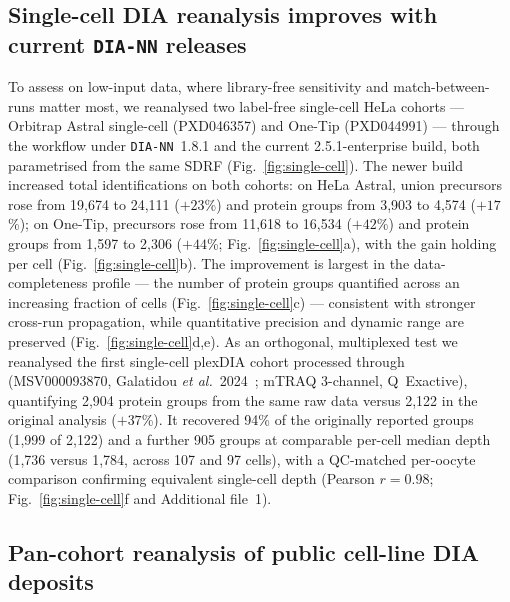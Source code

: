 \subsection{Single-cell DIA reanalysis improves with current \texttt{DIA-NN} releases}
\label{sec:single-cell}

To assess \quantmsdiann{} on low-input data, where library-free sensitivity and match-between-runs matter most, we reanalysed two label-free single-cell HeLa cohorts --- Orbitrap Astral single-cell (PXD046357) and One-Tip (PXD044991) --- through the workflow under \texttt{DIA-NN}~1.8.1 and the current 2.5.1-enterprise build, both parametrised from the same SDRF (Fig.~\ref{fig:single-cell}).
The newer build increased total identifications on both cohorts: on HeLa Astral, union precursors rose from 19{,}674 to 24{,}111 ($+23$\%) and protein groups from 3{,}903 to 4{,}574 ($+17$\%); on One-Tip, precursors rose from 11{,}618 to 16{,}534 ($+42$\%) and protein groups from 1{,}597 to 2{,}306 ($+44$\%; Fig.~\ref{fig:single-cell}a), with the gain holding per cell (Fig.~\ref{fig:single-cell}b).
The improvement is largest in the data-completeness profile --- the number of protein groups quantified across an increasing fraction of cells (Fig.~\ref{fig:single-cell}c) --- consistent with stronger cross-run propagation, while quantitative precision and dynamic range are preserved (Fig.~\ref{fig:single-cell}d,e).
As an orthogonal, multiplexed test we reanalysed the first single-cell plexDIA cohort processed through \quantmsdiann{} (MSV000093870, Galatidou \textit{et al.}~2024~\cite{galatidou2024oocyte}; mTRAQ 3-channel, Q~Exactive), quantifying 2{,}904 protein groups from the same raw data versus 2{,}122 in the original analysis ($+37$\%). It recovered 94\% of the originally reported groups (1{,}999 of 2{,}122) and a further 905 groups at comparable per-cell median depth (1{,}736 versus 1{,}784, across 107 and 97 cells), with a QC-matched per-oocyte comparison confirming equivalent single-cell depth (Pearson $r=0.98$; Fig.~\ref{fig:single-cell}f and Additional file~1).

\subsection{Pan-cohort reanalysis of public cell-line DIA deposits}
\label{sec:reanalyses}

